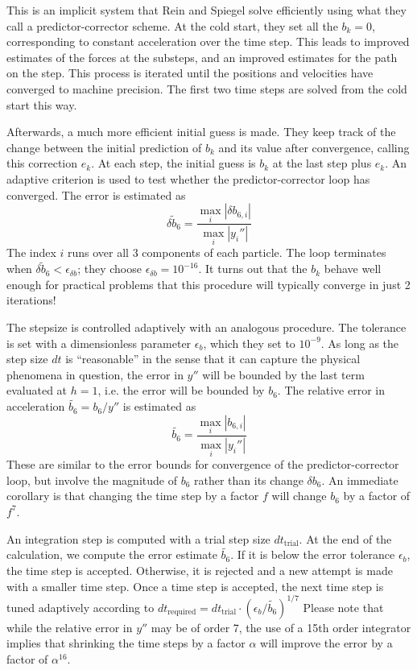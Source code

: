 This is an implicit system that Rein and Spiegel solve efficiently using what they call a predictor-corrector scheme.
At the cold start, they set all the $b_k=0$, corresponding to constant acceleration over the time step.
This leads to improved estimates of the forces at the substeps, and an improved estimates for the path on the step.
This process is iterated until the positions and velocities have converged to machine precision.
The first two time steps are solved from the cold start this way.  

Afterwards, a much more efficient initial guess is made.  
They keep track of the change between the initial prediction of $b_k$ and its value after convergence,
calling this correction $e_k$.  At each step, the initial guess is $b_k$ at the last step plus $e_k$.
An adaptive criterion is used to test whether the predictor-corrector loop has converged.
The error is estimated as 
$$\widetilde{\delta b_6} = \frac{\max_i |\delta b_{6,i}|}{\max_i |y_i''|}$$
The index $i$ runs over all 3 components of each particle.
The loop terminates when $ \widetilde{\delta b_6} < \epsilon_{\delta b}$; they choose $\epsilon_{\delta b} = 10^{-16}$.
It turns out that the $b_k$ behave well enough for practical problems that this procedure will
typically converge in just 2 iterations!

The stepsize is controlled adaptively with an analogous procedure.
The tolerance is set with a dimensionless parameter $\epsilon_b$,
which they set to $10^{-9}$.
As long as the step size $dt$ is ``reasonable'' in the sense that it can capture
the physical phenomena in question, the error in $y''$ will be bounded by the last term
evaluated at $h=1$, i.e. the error will be bounded by $b_6$.
The relative error in acceleration $\widetilde{b_6} = b_6 / y''$ is estimated as
$$ \widetilde{b_6} = \frac{\max_i |b_{6,i}|}{\max_i |y_i''|}$$
These are similar to the error bounds for convergence of the predictor-corrector loop,
but involve the magnitude of $b_6$ rather than its change $\delta b_6$.
An immediate corollary is that changing the time step by a factor $f$ will change $b_6$
by a factor of $f^7$.

An integration step is computed with a trial step size $dt_{\text{trial}}$.
At the end of the calculation, we compute the error estimate $\widetilde{b_6}$.
If it is below the error tolerance $\epsilon_b$, the time step is accepted.
Otherwise, it is rejected and a new attempt is made with a smaller time step.
Once a time step is accepted, the next  time step is tuned adaptively according to
$dt_{\text{required}} = dt_{\text{trial}} \cdot \left( \epsilon_b / \widetilde{b_6}\right)^{1/7}$
Please note that while the relative error in $y''$ may be of order 7, 
the use of a 15th order integrator implies that 
shrinking the time steps by a factor $\alpha$ will improve the error by a factor of $\alpha^{16}$.

